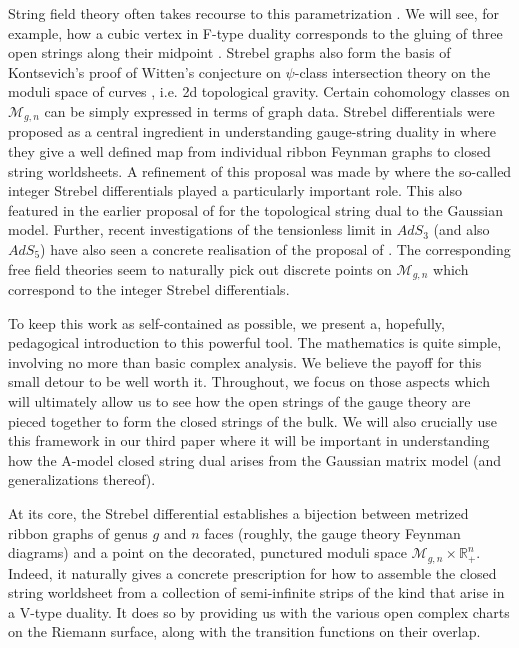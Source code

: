 \documentclass[english]{article}
\let\mc=\mathcal
\let\mb=\mathbb
\begin{document}
String field theory often takes recourse to this parametrization \cite{ZwiebachProof}. We will see, for example, how a cubic vertex in F-type duality corresponds to the gluing of three open strings along their midpoint \cite{WittenOSFT}. Strebel graphs also form the basis of Kontsevich's proof of Witten's conjecture on $\psi$-class intersection theory on the moduli space of curves \cite{KontsevichAiry}, i.e. 2d topological gravity. Certain cohomology classes on $\mc{M}_{g,n}$ can be simply expressed in terms of graph data. Strebel differentials were proposed as a central ingredient in understanding gauge-string duality in \cite{freefieldsIII} where they give a well defined map from individual ribbon Feynman graphs to closed string worldsheets. A refinement of this proposal was made by \cite{razamatGauss} where the so-called integer Strebel differentials played a particularly important role. This also featured in the earlier proposal of \cite{gopakumar2011simplest, gopakumar2013correlators} for the topological string dual to the Gaussian model. Further, recent investigations \cite{gaberdiel2021symmetric, ads5strebel, knighton} of the tensionless limit in $AdS_3$ (and also $AdS_5$) have also seen a concrete realisation of the proposal of \cite{freefieldsIII, razamatGauss}. The corresponding free field theories seem to naturally pick out discrete points on $\mc{M}_{g,n}$ which correspond to the integer Strebel differentials.

To keep this work as self-contained as possible, we present a, hopefully, pedagogical introduction to this powerful tool. The mathematics is quite simple, involving no more than basic complex analysis. We believe the payoff for this small detour to be well worth it. Throughout, we focus on those aspects which will ultimately allow us to see how the open strings of the gauge theory are pieced together to form the closed strings of the bulk. We will also crucially use this framework in our third paper where it will be important in understanding how the A-model closed string dual arises from the Gaussian matrix model (and generalizations thereof). 

At its core, the Strebel differential establishes a bijection between metrized ribbon graphs of genus $g$ and $n$ faces (roughly, the gauge theory Feynman diagrams) and a point on the decorated, punctured moduli space $\mc{M}_{g,n} \times \mb{R}_{+}^{n}$. Indeed, it naturally gives a concrete prescription for how to assemble the closed string worldsheet from a collection of semi-infinite strips of the kind that arise in a V-type duality. It does so by providing us with the various open complex charts on the Riemann surface, along with the transition functions on their overlap. 
\end{document}
